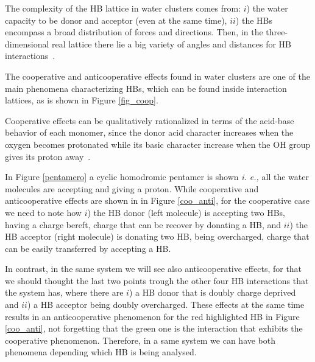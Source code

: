 The complexity of the HB lattice in water clusters comes from: $i$) the water
capacity to be donor and acceptor (even at the same time), $ii$) the HBs
encompass a broad distribution of forces and directions.  Then, in the
three-dimensional real lattice there lie a big variety of angles and distances
for HB interactions~\cite{liu_science, smith2005}. 

The cooperative and anticooperative effects found in water clusters are one of
the main phenomena characterizing HBs, which can be found inside interaction
lattices, as is shown in Figure \ref{fig_coop}. 

Cooperative effects can be qualitatively rationalized in terms of the acid-base
behavior of each monomer, since the donor acid character increases when the
oxygen becomes protonated while its basic character increase when the OH group
gives its proton away~\cite{M1992}.

In Figure \ref{pentamero} a cyclic homodromic pentamer is shown \textit{i. e.,}
all the water molecules are accepting and giving a proton.  While cooperative
and anticooperative effects are shown in in Figure \ref{coo_anti}, for the
cooperative case we need to note how $i$) the HB donor (left molecule) is
accepting two HBs, having a charge bereft, charge that can be recover by
donating a HB, and $ii$) the HB acceptor (right molecule) is donating two HB,
being overcharged, charge that can be easily transferred by accepting a HB.

In contrast, in the same system we will see also anticooperative effects, for
that we should thought the last two points trough the other four HB
interactions that the system has, where there are $i$) a HB donor that is
doubly charge deprived and $ii$) a HB acceptor being doubly overcharged.  These
effects at the same time results in an anticooperative phenomenon for the red
highlighted HB in Figure \ref{coo_anti}, not forgetting that the green one is
the interaction that exhibits the cooperative phenomenon. Therefore, in a same
system we can have both phenomena depending which HB is being analysed.


